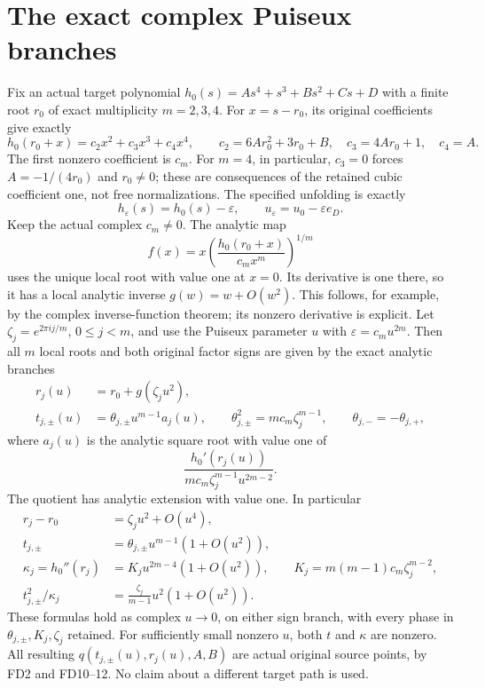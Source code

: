 \section{The exact complex Puiseux branches}
Fix an actual target polynomial \(h_0(s)=As^4+s^3+Bs^2+Cs+D\)
with a finite root \(r_0\) of exact multiplicity \(m=2,3,4\).
For \(x=s-r_0\), its original coefficients give exactly
\[
 h_0(r_0+x)=c_2x^2+c_3x^3+c_4x^4,\qquad
 c_2=6Ar_0^2+3r_0+B,\quad c_3=4Ar_0+1,\quad c_4=A.
 \tag{FD9}
\]
The first nonzero coefficient is \(c_m\).
For \(m=4\), in particular, \(c_3=0\) forces
\(A=-1/(4r_0)\) and \(r_0\ne0\); these are consequences
of the retained cubic coefficient one, not free normalizations.
The specified unfolding is exactly
\[
 h_\varepsilon(s)=h_0(s)-\varepsilon,\qquad
 u_\varepsilon=u_0-\varepsilon e_D.
 \tag{FD10}
\]
Keep the actual complex \(c_m\ne0\). The analytic map
\[
 f(x)=x\left(\frac{h_0(r_0+x)}{c_mx^m}\right)^{1/m}
 \tag{FD11}
\]
uses the unique local root with value one at \(x=0\).
Its derivative is one there, so it has a local analytic inverse
\(g(w)=w+O(w^2)\). This follows, for example, by the complex
inverse-function theorem; its nonzero derivative is explicit.
Let \(\zeta_j=e^{2\pi ij/m}\), \(0\le j<m\), and use the
Puiseux parameter \(u\) with \(\varepsilon=c_mu^{2m}\).
Then all \(m\) local roots and both original factor signs are
given by the exact analytic branches
\[
\begin{aligned}
 r_j(u)&=r_0+g(\zeta_j u^2),\\
 t_{j,\pm}(u)&=\theta_{j,\pm}u^{m-1}a_j(u),\qquad
 \theta_{j,\pm}^2=mc_m\zeta_j^{m-1},\qquad
 \theta_{j,-}=-\theta_{j,+},
\end{aligned}\tag{FD12}
\]
where \(a_j(u)\) is the analytic square root with value one of
\[
 \frac{h_0'(r_j(u))}
                  {mc_m\zeta_j^{m-1}u^{2m-2}}.
\]
The quotient has analytic extension with value one. In particular
\[
\begin{aligned}
 r_j-r_0&=\zeta_ju^2+O(u^4),\\
 t_{j,\pm}&=\theta_{j,\pm}u^{m-1}(1+O(u^2)),\\
 \kappa_j=h_0''(r_j)&=K_j u^{2m-4}(1+O(u^2)),\qquad
 K_j=m(m-1)c_m\zeta_j^{m-2},\\
 t_{j,\pm}^2/\kappa_j&=\frac{\zeta_j}{m-1}u^2(1+O(u^2)).
\end{aligned}\tag{FD13}
\]
These formulas hold as complex \(u\to0\), on either sign
branch, with every phase in \(\theta_{j,\pm},K_j,\zeta_j\)
retained. For sufficiently small nonzero \(u\), both \(t\)
and \(\kappa\) are nonzero. All resulting
\(q(t_{j,\pm}(u),r_j(u),A,B)\) are actual original source
points, by FD2 and FD10--12. No claim about a different
target path is used.

